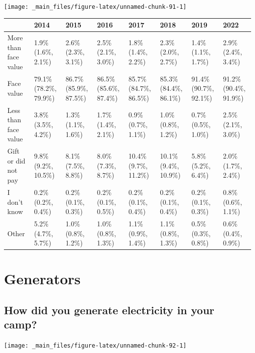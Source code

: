 \documentclass[
]{book}
\begin{document}
\texttt{[image: \_main\_files/figure-latex/unnamed-chunk-91-1]}

\begin{table}
\centering
\begin{tabular}[t]{>{}l|>{}l|>{}l|>{}l|>{}l|>{}l|>{}l|>{}l}
\hline
  & 2014 & 2015 & 2016 & 2017 & 2018 & 2019 & 2022\\
\hline
More than face value & 1.9\% (1.6\%, 2.1\%) & 2.6\% (2.3\%, 3.1\%) & 2.5\% (2.1\%, 3.0\%) & 1.8\% (1.4\%, 2.2\%) & 2.3\% (2.0\%, 2.7\%) & 1.4\% (1.1\%, 1.7\%) & 2.9\% (2.4\%, 3.4\%)\\
\hline
Face value & 79.1\% (78.2\%, 79.9\%) & 86.7\% (85.9\%, 87.5\%) & 86.5\% (85.6\%, 87.4\%) & 85.7\% (84.7\%, 86.5\%) & 85.3\% (84.4\%, 86.1\%) & 91.4\% (90.7\%, 92.1\%) & 91.2\% (90.4\%, 91.9\%)\\
\hline
Less than face value & 3.8\% (3.5\%, 4.2\%) & 1.3\% (1.1\%, 1.6\%) & 1.7\% (1.4\%, 2.1\%) & 0.9\% (0.7\%, 1.1\%) & 1.0\% (0.8\%, 1.2\%) & 0.7\% (0.5\%, 1.0\%) & 2.5\% (2.1\%, 3.0\%)\\
\hline
Gift or did not pay & 9.8\% (9.2\%, 10.5\%) & 8.1\% (7.5\%, 8.8\%) & 8.0\% (7.3\%, 8.7\%) & 10.4\% (9.7\%, 11.2\%) & 10.1\% (9.4\%, 10.9\%) & 5.8\% (5.2\%, 6.4\%) & 2.0\% (1.7\%, 2.4\%)\\
\hline
I don't know & 0.2\% (0.2\%, 0.4\%) & 0.2\% (0.1\%, 0.3\%) & 0.2\% (0.1\%, 0.5\%) & 0.2\% (0.1\%, 0.4\%) & 0.2\% (0.1\%, 0.4\%) & 0.2\% (0.1\%, 0.3\%) & 0.8\% (0.6\%, 1.1\%)\\
\hline
Other & 5.2\% (4.7\%, 5.7\%) & 1.0\% (0.8\%, 1.2\%) & 1.0\% (0.8\%, 1.3\%) & 1.1\% (0.9\%, 1.4\%) & 1.1\% (0.8\%, 1.3\%) & 0.5\% (0.3\%, 0.8\%) & 0.6\% (0.4\%, 0.9\%)\\
\hline
\end{tabular}
\end{table}

\hypertarget{generators}{%
\section{Generators}\label{generators}}

\hypertarget{how-did-you-generate-electricity-in-your-camp}{%
\subsection{How did you generate electricity in your camp?}\label{how-did-you-generate-electricity-in-your-camp}}

\texttt{[image: \_main\_files/figure-latex/unnamed-chunk-92-1]}
\end{document}
